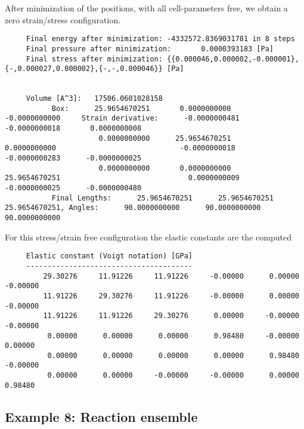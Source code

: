 \noindent
After minimization of the positions, with all cell-parameters free, we obtain a zero strain/stress configuration.
\begin{tiny}
\begin{verbatim}
     Final energy after minimization: -4332572.8369031781 in 8 steps
     Final pressure after minimization:       0.0000393183 [Pa]
     Final stress after minimization: {{0.000046,0.000002,-0.000001},{-,0.000027,0.000002},{-,-,0.000046}} [Pa]


     Volume [A^3]:   17506.0601028158
           Box:      25.9654670251       0.0000000000      -0.0000000000     Strain derivative:      -0.0000000481      -0.0000000018       0.0000000008
                      0.0000000000      25.9654670251       0.0000000000                             -0.0000000018      -0.0000000283      -0.0000000025
                      0.0000000000       0.0000000000      25.9654670251                              0.0000000009      -0.0000000025      -0.0000000480
           Final Lengths:      25.9654670251      25.9654670251      25.9654670251, Angles:      90.0000000000      90.0000000000      90.0000000000
\end{verbatim}
\end{tiny}

\noindent
For this stress/strain free configuration the elastic constants are the computed
\begin{tiny}
\begin{verbatim}
     Elastic constant (Voigt notation) [GPa]
     ---------------------------------------
         29.30276     11.91226     11.91226     -0.00000      0.00000     -0.00000
         11.91226     29.30276     11.91226     -0.00000      0.00000     -0.00000
         11.91226     11.91226     29.30276      0.00000     -0.00000     -0.00000
          0.00000      0.00000      0.00000      0.98480     -0.00000      0.00000
          0.00000      0.00000      0.00000      0.00000      0.98480     -0.00000
          0.00000      0.00000     -0.00000     -0.00000      0.00000      0.98480
\end{verbatim}
\end{tiny}

\subsection*{Example 8: Reaction ensemble}

